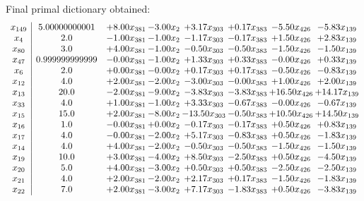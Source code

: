\documentclass[8pt]{article}
\begin{document}
 Final primal dictionary obtained: 
\[\begin{array}{c| c c@{\hskip 2pt} c@{\hskip 2pt} c@{\hskip 2pt} c@{\hskip 2pt} c@{\hskip 2pt} c@{\hskip 2pt} }
 x_{149}   &  5.00000000001 & +  8.00 x_{381} & -3.00 x_{2} & +  3.17 x_{303} & +  0.17 x_{383} & -5.50 x_{426} & -5.83 x_{139}\\
 x_{4}   &  2.0 & -1.00 x_{381} & -1.00 x_{2} & -1.17 x_{303} & -0.17 x_{383} & +  1.50 x_{426} & +  2.83 x_{139}\\
 x_{80}   &  3.0 & +  4.00 x_{381} & -1.00 x_{2} & -0.50 x_{303} & -0.50 x_{383} & -1.50 x_{426} & -1.50 x_{139}\\
 x_{47}   &  0.999999999999 & -0.00 x_{381} & -1.00 x_{2} & +  1.33 x_{303} & +  0.33 x_{383} & -0.00 x_{426} & +  0.33 x_{139}\\
 x_{6}   &  2.0 & +  0.00 x_{381} & -0.00 x_{2} & +  0.17 x_{303} & +  0.17 x_{383} & -0.50 x_{426} & -0.83 x_{139}\\
 x_{12}   &  4.0 & +  2.00 x_{381} & -2.00 x_{2} & -3.00 x_{303} & -0.00 x_{383} & +  1.00 x_{426} & +  2.00 x_{139}\\
 x_{13}   &  20.0 & -2.00 x_{381} & -9.00 x_{2} & -3.83 x_{303} & -3.83 x_{383} & + 16.50 x_{426} & + 14.17 x_{139}\\
 x_{33}   &  4.0 & +  1.00 x_{381} & -1.00 x_{2} & +  3.33 x_{303} & -0.67 x_{383} & -0.00 x_{426} & -0.67 x_{139}\\
 x_{15}   &  15.0 & +  2.00 x_{381} & -8.00 x_{2} & -13.50 x_{303} & -0.50 x_{383} & + 10.50 x_{426} & + 14.50 x_{139}\\
 x_{16}   &  1.0 & -0.00 x_{381} & +  0.00 x_{2} & -0.17 x_{303} & -0.17 x_{383} & +  0.50 x_{426} & +  0.83 x_{139}\\
 x_{17}   &  4.0 & -0.00 x_{381} & -2.00 x_{2} & +  5.17 x_{303} & -0.83 x_{383} & +  0.50 x_{426} & -1.83 x_{139}\\
 x_{14}   &  4.0 & +  4.00 x_{381} & -2.00 x_{2} & -0.50 x_{303} & -0.50 x_{383} & -1.50 x_{426} & -1.50 x_{139}\\
 x_{19}   &  10.0 & +  3.00 x_{381} & -4.00 x_{2} & +  8.50 x_{303} & -2.50 x_{383} & +  0.50 x_{426} & -4.50 x_{139}\\
 x_{20}   &  5.0 & +  4.00 x_{381} & -3.00 x_{2} & +  0.50 x_{303} & +  0.50 x_{383} & -2.50 x_{426} & -2.50 x_{139}\\
 x_{21}   &  4.0 & +  2.00 x_{381} & -2.00 x_{2} & +  2.17 x_{303} & +  0.17 x_{383} & -1.50 x_{426} & -1.83 x_{139}\\
 x_{22}   &  7.0 & +  2.00 x_{381} & -3.00 x_{2} & +  7.17 x_{303} & -1.83 x_{383} & +  0.50 x_{426} & -3.83 x_{139}\\

\end{array}\]
\end{document}
